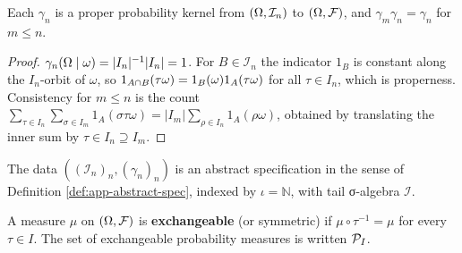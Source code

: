 \begin{lemma}
    \label{lem:app-symm-kernel-proper}
    \leanok

    Each $\gamma_n$ is a proper probability kernel from $(\Omega, \mathcal{I}_n)$ to
    $(\Omega, \mathcal{F})$, and $\gamma_m \gamma_n = \gamma_n$ for $m \le n$.
\end{lemma}
\begin{proof}
    \leanok

    $\gamma_n(\Omega \mid \omega) = |I_n|^{-1}|I_n| = 1$.  For $B \in \mathcal{I}_n$ the
    indicator $1_B$ is constant along the $I_n$-orbit of $\omega$, so
    $1_{A \cap B}(\tau\omega) = 1_B(\omega)1_A(\tau\omega)$ for all $\tau \in I_n$, which is
    properness.  Consistency for $m \le n$ is the count
    $\sum_{\tau \in I_n} \sum_{\sigma \in I_m} 1_A(\sigma\tau\omega)
      = |I_m| \sum_{\rho \in I_n} 1_A(\rho\omega)$, obtained by translating the inner sum by
    $\tau \in I_n \supseteq I_m$.
\end{proof}

\begin{definition}
    \label{def:app-exchangeable-spec}
    \leanok

    The data $((\mathcal{I}_n)_n, (\gamma_n)_n)$ is an abstract specification in the sense of
    Definition \ref{def:app-abstract-spec}, indexed by $\iota = \mathbb{N}$, with tail
    σ-algebra $\mathcal{I}$.
\end{definition}

\begin{definition}
    \label{def:app-is-exchangeable}
    \leanok

    A measure $\mu$ on $(\Omega, \mathcal{F})$ is \textbf{exchangeable} (or symmetric) if
    $\mu \circ \tau^{-1} = \mu$ for every $\tau \in I$.  The set of exchangeable probability
    measures is written $\mathcal{P}_I$.
\end{definition}

